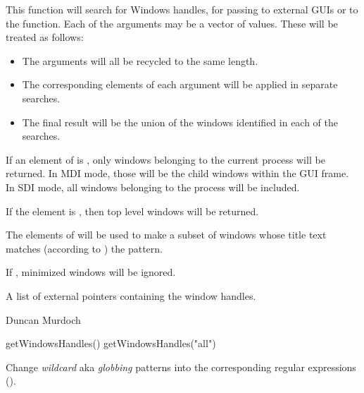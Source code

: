 \begin{Details}\relax
This function will search for Windows handles, for passing to external
GUIs or to the  function.  Each of the
arguments may be a vector of values.  These will be treated as
follows:
\begin{itemize}

\item The arguments will all be recycled to the same length.
\item The corresponding elements of each argument will be applied in
separate searches.
\item The final result will be the union of the windows identified in
each of the searches.

\end{itemize}


If an element of  is , only windows belonging to
the current \R{} process will be returned.  In MDI mode, those will be the
child windows within the \R{} GUI frame.  In SDI mode, all windows
belonging to the process will be included.

If the element is , then top level windows will be returned.

The elements of  will be used to make a subset of windows
whose title text matches (according to ) the pattern.

If , minimized windows will be ignored.
\end{Details}
%
\begin{Value}
A list of external pointers containing the window handles.
\end{Value}
%
\begin{Author}\relax
Duncan Murdoch
\end{Author}
%
\begin{SeeAlso}\relax
{}
\end{SeeAlso}
%
\begin{Examples}
\begin{ExampleCode}

getWindowsHandles()
getWindowsHandles("all")
\end{ExampleCode}
\end{Examples}
%
\begin{Description}\relax
Change \emph{wildcard} aka \emph{globbing} patterns into the
corresponding regular expressions ().
\end{Description}
